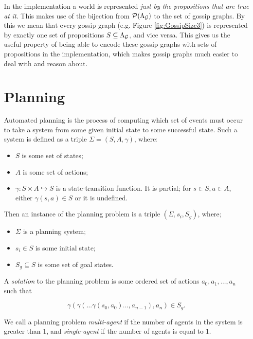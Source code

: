 \documentclass[10pt, a4paper]{report}
\begin{document}
In the implementation a world is represented \emph{just by the propositions that
  are true at it}. This makes use of the bijection from
$\mathcal{P}(\Lambda_{\mathcal{G}})$ to the set of gossip graphs. By this we mean that
every gossip graph (e.g. Figure \ref{fig:GossipSize3}) is represented by exactly
one set of propositions $S \subseteq \Lambda_{\mathcal{G}}$, and vice versa. This
gives us the useful property of being able to encode these gossip graphs with
sets of propositions in the implementation, which makes gossip graphs much easier to
deal with and reason about.

\section{Planning}
\label{sec:Planning}

Automated planning is the process of computing which set of events must occur to
take a system from some given initial state to some successful state. Such a
system is defined as a triple $\Sigma = (S, A, \gamma)$, where:

\begin{itemize}
\item $S$ is some set of states;
\item $A$ is some set of actions;
\item $\gamma : S \times A \hookrightarrow S$ is a state-transition function. It
  is partial; for $s \in S, a \in A$, either $\gamma(s, a) \in S$ or it is
  undefined. 
\end{itemize}

Then an instance of the planning problem is a triple $(\Sigma, s_i, S_g)$,
where;

\begin{itemize}
\item $\Sigma$ is a planning system;
\item $s_i \in S$ is some initial state;
\item $S_g \subseteq S$ is some set of goal states.  
\end{itemize}

A \emph{solution} to the planning problem is some ordered set of actions
${a_0, a_1, \ldots, a_n}$ such that

\[\gamma(\gamma(\ldots \gamma(s_0, a_0) \ldots ,a_{n-1}) ,a_n) \in S_g. \]

We call a planning problem \emph{multi-agent} if the number of
agents in the system is greater than 1, and \emph{single-agent} if the number
of agents is equal to 1. 
\end{document}
